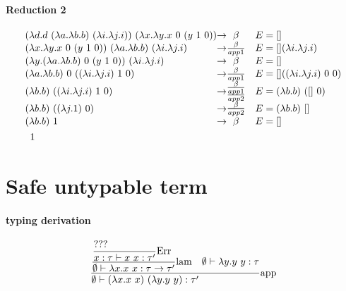 \documentclass{article}
\newcommand{\st}[3][]{\ensuremath{\displaystyle\frac{#3\hfill}{#2\hfill} \text{#1}}}
\newcommand{\N}{\ensuremath \mathbb N}
\newcommand{\lam}[2]{\ensuremath{\lambda#1.#2}}
\begin{document}
\paragraph{Reduction 2}
\begin{align*}
    &\begin{array}{l @{\to} c l}
        (\lam{d}{d\ (\lam{a}\lam{b}{b})\ (\lam{i}\lam{j}{i})})\ (\lam{x}\lam{y}{x\ 0\ (y\ 1\ 0)}) & \beta & E=[] \\
        (\lam{x}\lam{y}{x\ 0\ (y\ 1\ 0)})\ (\lam{a}\lam{b}{b})\ (\lam{i}\lam{j}{i}) & \frac{\beta}{app1} & E=[](\lam{i}\lam{j}{i}) \\
        (\lam{y}{(\lam{a}\lam{b}{b})\ 0\ (y\ 1\ 0)})\ (\lam{i}\lam{j}{i}) & \beta & E=[] \\
        (\lam{a}\lam{b}{b})\ 0\ ((\lam{i}\lam{j}{i})\ 1\ 0)\  & \frac\beta{app1} & E=[]((\lam{i}\lam{j}{i})\ 0\ 0) \\
        (\lam{b}{b})\ ((\lam{i}\lam{j}{i})\ 1\ 0)\  & \substack{\beta\\\hline\\app1\\\hline\\app2} & E=(\lam b b)\ ([]\ 0) \\
        (\lam{b}{b})\ ((\lam{j}{1})\ 0)\  & \substack{\beta\\\hline\\\hline\\app2} & E=(\lam b b)\ [] \\
        (\lam{b}{b})\ 1 & \beta & E= [] \\
    \end{array}\\
    &\quad 1
\end{align*}


\section{Safe untypable term}
\paragraph{typing derivation}
\begin{align*}
    \st[app]{
        \emptyset\vdash (\lam{x}{x\ x})\ (\lam{y}{y\ y}): \tau'
    }{
        \st[lam]{
            \emptyset\vdash\lam{x}{x\ x}:\tau\to\tau'
        }{
            \st[Err] {
                x:\tau\vdash x\ x: \tau'
            }{???}
        }
        \quad 
        \emptyset\vdash\lam{y}{y\ y}:\tau
    }
\end{align*}
\end{document}
